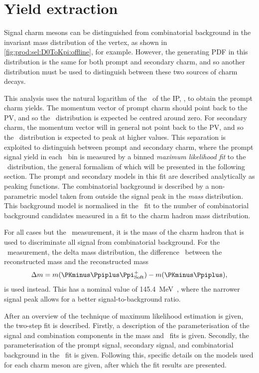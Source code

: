 \chapter{Yield extraction}
\label{chap:prod:fitting}

Signal charm mesons can be distinguished from combinatorial background in the 
invariant mass distribution of the vertex, as shown in 
\cref{fig:prod:sel:D0ToKpi:offline}, for example.
However, the generating \acf{PDF} in this distribution is the same for both 
prompt and secondary charm, and so another distribution must be used to 
distinguish between these two sources of charm decays.

This analysis uses the natural logarithm of the \chisq\ of the \acf{IP}, 
\lnipchisq, to obtain the prompt charm yields.
The momentum vector of prompt charm should point back to the \acf{PV}, and so 
the \lnipchisq\ distribution is expected be centred around zero.
For secondary charm, the momentum vector will in general not point back to the 
\ac{PV}, and so the \lnipchisq\ distribution is expected to peak at higher 
values.
This separation is exploited to distinguish between prompt and secondary charm, 
where the prompt signal yield in each \pTy\ bin is measured by a binned 
\emph{maximum likelihood fit} to the \lnipchisq\ distribution, the general 
formalism of which will be presented in the following section.
The prompt and secondary models in this fit are described analytically as 
peaking functions.
The combinatorial background is described by a non-parametric model taken from 
outside the signal peak in the \emph{mass} distribution.
This background model is normalised in the \lnipchisq\ fit to the number of 
combinatorial background candidates measured in a fit to the charm hadron mass 
distribution.

For all cases but the \PDstarp\ measurement, it is the mass of the charm hadron 
that is used to discriminate all signal from combinatorial background.
For the \PDstarp\ measurement, the delta mass distribution, the difference 
\deltam\ between the reconstructed \PDstarp mass and the reconstructed \PDzero 
mass
\begin{equation}
  \deltam = m(\PKminus\Ppiplus\Ppiplussoft) - m(\PKminus\Ppiplus),
\end{equation}
is used instead.
This has a nominal value of \SI{145.4}{\MeV}~\cite{PDG2014}, where the narrower 
signal peak allows for a better signal-to-background ratio.

After an overview of the technique of maximum likelihood estimation is given, 
the two-step fit is described.
Firstly, a description of the parameterisation of the signal and combination 
components in the mass and \deltam\ fits is given.
Secondly, the parameterisation of the prompt signal, secondary signal, and 
combinatorial background in the \lnipchisq\ fit is given.
Following this, specific details on the models used for each charm meson are 
given, after which the fit results are presented.

